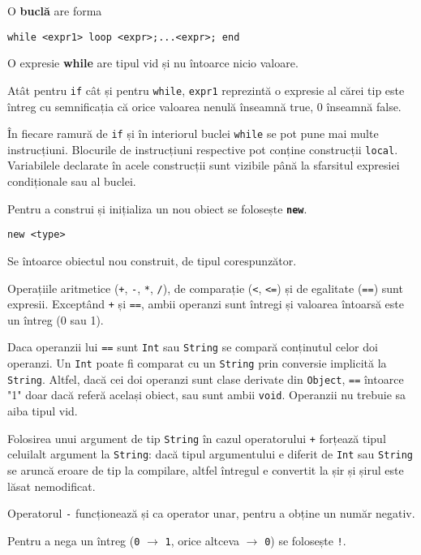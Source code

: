 \documentclass[12pt]{article}
\begin{document}
O \textbf{buclă} are forma

\begin{verbatim}
while <expr1> loop <expr>;...<expr>; end
\end{verbatim}

O expresie \textbf{while} are tipul vid și nu întoarce nicio valoare.

Atât pentru \texttt{if} cât și pentru \texttt{while}, \texttt{expr1} reprezintă o expresie al cărei tip este întreg cu semnificația că orice valoarea nenulă înseamnă true, 0 înseamnă false.

În fiecare ramură de \texttt{if} și în interiorul buclei \texttt{while} se pot pune mai multe instrucțiuni. Blocurile de instrucțiuni respective pot conține construcții \texttt{local}. Variabilele declarate în acele construcții sunt vizibile până la sfarsitul expresiei condiționale sau al buclei.


Pentru a construi și inițializa un nou obiect se folosește \textbf{\texttt{new}}.

\begin{verbatim}
new <type>
\end{verbatim}

Se întoarce obiectul nou construit, de tipul corespunzător.

Operațiile aritmetice (\texttt{+}, \texttt{-}, \texttt{*}, \texttt{/}), de comparație (\texttt{<}, \texttt{<=}) și de egalitate (\texttt{==}) sunt expresii. Exceptând \texttt{+} și \texttt{==}, ambii operanzi sunt întregi și valoarea întoarsă este un întreg (0 sau 1).

Daca operanzii lui \texttt{==} sunt \texttt{Int} sau \texttt{String} se compară conținutul celor doi operanzi. Un \texttt{Int} poate fi comparat cu un \texttt{String} prin conversie implicită la \texttt{String}. Altfel, dacă cei doi operanzi sunt clase derivate din \texttt{Object}, \texttt{==} întoarce "1" doar dacă referă același obiect, sau sunt ambii \texttt{void}. Operanzii nu trebuie sa aiba tipul vid.

Folosirea unui argument de tip \texttt{String} în cazul operatorului \texttt{+} forțează tipul celuilalt argument la \texttt{String}: dacă tipul argumentului e diferit de \texttt{Int} sau \texttt{String} se aruncă eroare de tip la compilare, altfel întregul e convertit la șir și șirul este lăsat nemodificat.

Operatorul \texttt{-} funcționează și ca operator unar, pentru a obține un număr negativ.

Pentru a nega un întreg (\texttt{0} $\rightarrow$ \texttt{1}, orice altceva $\rightarrow$ \texttt{0}) se folosește \texttt{!}.
\end{document}
